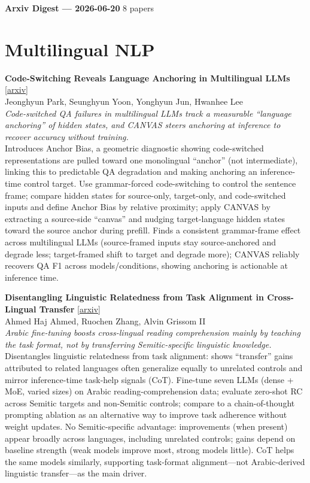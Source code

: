 \documentclass[12pt,letterpaper]{article}
\begin{document}
{\footnotesize\textbf{Arxiv Digest --- 2026-06-20} \hfill 8 papers}

\smallskip

\section*{Multilingual NLP}

{\small\textbf{Code-Switching Reveals Language Anchoring in Multilingual LLMs}} {\scriptsize[\href{https://arxiv.org/abs/2606.19668}{arxiv}]}\\
{\scriptsize Jeonghyun Park, Seunghyun Yoon, Yonghyun Jun, Hwanhee Lee}\\

{\small\textit{Code-switched QA failures in multilingual LLMs track a measurable ``language anchoring'' of hidden states, and CANVAS steers anchoring at inference to recover accuracy without training.}}\\[1pt]
{\footnotesize Introduces Anchor Bias, a geometric diagnostic showing code-switched representations are pulled toward one monolingual ``anchor'' (not intermediate), linking this to predictable QA degradation and making anchoring an inference-time control target. Use grammar-forced code-switching to control the sentence frame; compare hidden states for source-only, target-only, and code-switched inputs and define Anchor Bias by relative proximity; apply CANVAS by extracting a source-side ``canvas'' and nudging target-language hidden states toward the source anchor during prefill. Finds a consistent grammar-frame effect across multilingual LLMs (source-framed inputs stay source-anchored and degrade less; target-framed shift to target and degrade more); CANVAS reliably recovers QA F1 across models/conditions, showing anchoring is actionable at inference time.}

\medskip

{\small\textbf{Disentangling Linguistic Relatedness from Task Alignment in Cross-Lingual Transfer}} {\scriptsize[\href{https://arxiv.org/abs/2606.19346}{arxiv}]}\\
{\scriptsize Ahmed Haj Ahmed, Ruochen Zhang, Alvin Grissom II}\\

{\small\textit{Arabic fine-tuning boosts cross-lingual reading comprehension mainly by teaching the task format, not by transferring Semitic-specific linguistic knowledge.}}\\[1pt]
{\footnotesize Disentangles linguistic relatedness from task alignment: shows ``transfer'' gains attributed to related languages often generalize equally to unrelated controls and mirror inference-time task-help signals (CoT). Fine-tune seven LLMs (dense + MoE, varied sizes) on Arabic reading-comprehension data; evaluate zero-shot RC across Semitic targets and non-Semitic controls; compare to a chain-of-thought prompting ablation as an alternative way to improve task adherence without weight updates. No Semitic-specific advantage: improvements (when present) appear broadly across languages, including unrelated controls; gains depend on baseline strength (weak models improve most, strong models little). CoT helps the same models similarly, supporting task-format alignment---not Arabic-derived linguistic transfer---as the main driver.}
\end{document}
